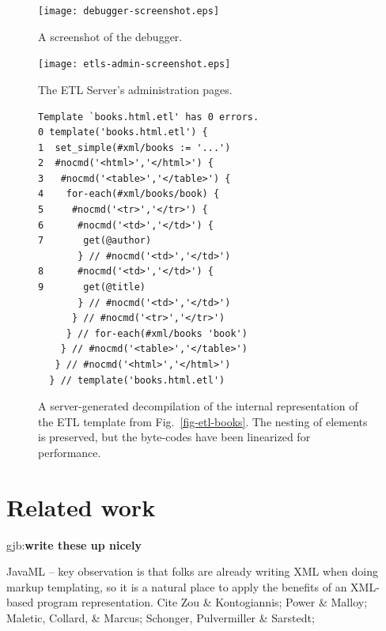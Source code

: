 \documentclass{www2003-submission}
\newcommand{\figref}[1]{Fig.~\ref{fig-#1}}
\newcommand{\gjb}[1]{{\sc gjb:}\textbf{#1}}
\begin{document}
\begin{figure}[tb]
\begin{centering}
\hspace*{-0.03\linewidth}\texttt{[image: debugger-screenshot.eps]}
\caption{A screenshot of the debugger.
\label{fig-debugger-screenshot}}
\end{centering}
\end{figure}


\begin{figure}[tb]
\begin{centering}
\hspace*{-0.05\linewidth}\texttt{[image: etls-admin-screenshot.eps]}
\caption{The ETL Server's administration pages.
\label{fig-etls-admin}}
\end{centering}
\end{figure}



\begin{figure}[htbp]
\begin{verbatim}
Template `books.html.etl' has 0 errors.
0 template('books.html.etl') {
1  set_simple(#xml/books := '...')
2  #nocmd('<html>','</html>') {
3   #nocmd('<table>','</table>') {
4    for-each(#xml/books/book) {
5     #nocmd('<tr>','</tr>') {
6      #nocmd('<td>','</td>') {
7       get(@author)
       } // #nocmd('<td>','</td>')
8      #nocmd('<td>','</td>') {
9       get(@title)
       } // #nocmd('<td>','</td>')
      } // #nocmd('<tr>','</tr>')
     } // for-each(#xml/books 'book')
    } // #nocmd('<table>','</table>')
   } // #nocmd('<html>','</html>')
  } // template('books.html.etl')
\end{verbatim}
\caption{A server-generated decompilation of the internal representation
of the ETL template from \figref{etl-books}.  The nesting of elements
is preserved, but the byte-codes have been linearized for performance.
\label{fig-etl-decompile}}
\end{figure}


\section{Related work}
\label{sec-related-work}

\gjb{write these up nicely}

JavaML -- key observation is that folks are already writing XML when
doing markup templating, so it is a natural place to apply the
benefits of an XML-based program representation.  Cite Zou \&
Kontogiannis; Power \& Malloy; Maletic, Collard, \& Marcus; Schonger,
Pulvermiller \& Sarstedt; 
\end{document}
